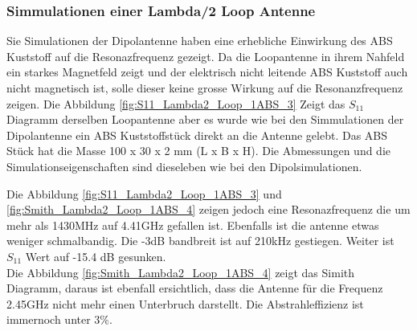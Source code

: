 \subsubsection{Simmulationen einer Lambda/2 Loop Antenne}\label{sec:SimL2Loop}
Sie Simulationen der Dipolantenne haben eine erhebliche Einwirkung des ABS Kuststoff auf die Resonazfrequenz gezeigt. Da die Loopantenne in ihrem Nahfeld ein starkes Magnetfeld zeigt und der elektrisch nicht leitende ABS Kuststoff auch nicht magnetisch ist, solle dieser keine grosse Wirkung auf die Resonanzfrequenz zeigen. 
Die Abbildung \ref{fig:S11_Lambda2_Loop_1ABS_3} Zeigt das $S_11$ Diagramm derselben Loopantenne aber es wurde wie bei den Simmulationen der Dipolantenne ein ABS Kuststoffstück direkt an die Antenne gelebt. Das ABS Stück hat die Masse 100 x 30 x 2 mm (L x B x H). Die Abmessungen und die Simulationseigenschaften sind dieseleben wie bei den Dipolsimulationen.

Die Abbildung \ref{fig:S11_Lambda2_Loop_1ABS_3} und \ref{fig:Smith_Lambda2_Loop_1ABS_4} zeigen jedoch eine Resonazfrequenz die um mehr als 1430MHz auf 4.41GHz gefallen ist. Ebenfalls ist die antenne etwas weniger schmalbandig. Die -3dB bandbreit ist auf 210kHz gestiegen. Weiter ist $S_{11}$ Wert auf -15.4 dB gesunken.\\Die Abbildung \ref{fig:Smith_Lambda2_Loop_1ABS_4} zeigt das Simith Diagramm, daraus ist ebenfall ersichtlich, dass die Antenne für die Frequenz 2.45GHz nicht mehr einen Unterbruch darstellt. Die Abstrahleffizienz ist immernoch unter $3\%$.


